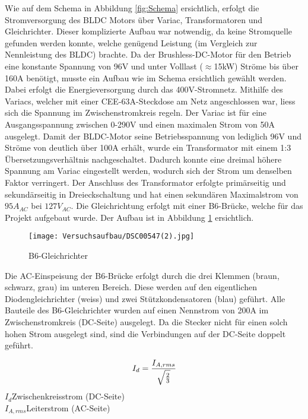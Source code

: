 Wie auf dem Schema in Abbildung \ref{fig:Schema} ersichtlich, erfolgt die Stromversorgung des BLDC Motors über Variac, Transformatoren und Gleichrichter. Dieser \glqq komplizierte \grqq Aufbau war notwendig, da keine Stromquelle gefunden werden konnte, welche genügend Leistung (im Vergleich zur Nennleistung des BLDC) brachte. Da der Brushless-DC-Motor für den Betrieb eine konstante Spannung von 96V und unter Volllast ($\approx$15kW) Ströme bis über 160A benötigt, musste ein Aufbau wie im Schema ersichtlich gewählt werden. Dabei erfolgt die Energieversorgung durch das 400V-Stromnetz. Mithilfe des Variacs, welcher mit einer CEE-63A-Steckdose am Netz angeschlossen war, liess sich die Spannung im Zwischenstromkreis regeln. Der Variac ist für eine Ausgangsspannung zwischen 0-290V und einen maximalen Strom von 50A ausgelegt. Damit der BLDC-Motor seine Betriebsspannung von lediglich 96V und Ströme von deutlich über 100A erhält, wurde ein Transformator mit einem 1:3 Übersetzungsverhältnis nachgeschaltet. Dadurch konnte eine dreimal höhere Spannung am Variac eingestellt werden, wodurch sich der Strom um denselben Faktor verringert. Der Anschluss des Transformator erfolgte primärseitig und sekundärseitig in Dreieckschaltung und hat einen sekundären Maximalstrom von $95A_{AC}$ bei $127V_{AC}$. Die Gleichrichtung erfolgt mit einer B6-Brücke, welche für das Projekt aufgebaut wurde. Der Aufbau ist in Abbildung \ref{fig:B6} ersichtlich.

\begin{figure}[H]
	\centering
	\texttt{[image: Versuchsaufbau/DSC00547(2).jpg]}
	\caption[B6-Gleichrichter]{B6-Gleichrichter}
	\label{fig:B6}
\end{figure}

Die AC-Einspeisung der B6-Brücke erfolgt durch die drei Klemmen (braun, schwarz, grau) im unteren Bereich. Diese werden auf den eigentlichen Diodengleichrichter (weiss) und zwei Stützkondensatoren (blau) geführt. Alle Bauteile des B6-Gleichrichter wurden auf einen Nennstrom von 200A im Zwischenstromkreis (DC-Seite) ausgelegt. Da die Stecker nicht für einen solch hohen Strom ausgelegt sind, sind die Verbindungen auf der DC-Seite doppelt geführt.

\begin{equation}
\centering
I_{d}=\frac{I_{A,rms}}{\sqrt{\frac{2}{3}}}
\label{eq:B6-Strom}
\end{equation}
$ I_{d} $\qquad\quad 	Zwischenkreisstrom (DC-Seite)      \\
$ I_{A,rms} $\quad Leiterstrom (AC-Seite)    \\

